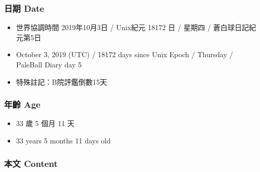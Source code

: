 \documentclass[a5paper, 12pt
]{book}
\providecommand{\tightlist}{%
  \setlength{\itemsep}{0pt}\setlength{\parskip}{0pt}}
\begin{document}
\hypertarget{ux65e5ux671f-date-2}{%
\subsubsection{日期 Date}\label{ux65e5ux671f-date-2}}

\begin{itemize}
\tightlist
\item
  世界協調時間 2019年10月3日 / Unix紀元 18172 日 / 星期四 /
  蒼白球日記紀元第5日
\item
  October 3, 2019 (UTC) / 18172 days since Unix Epoch / Thursday /
  PaleBall Diary day 5
\item
  特殊註記：B院評鑑倒數15天
\end{itemize}

\hypertarget{ux5e74ux9f61-age-2}{%
\subsubsection{年齡 Age}\label{ux5e74ux9f61-age-2}}

\begin{itemize}
\tightlist
\item
  33 歲 5 個月 11 天
\item
  33 years 5 months 11 days old
\end{itemize}

\hypertarget{ux672cux6587-content-2}{%
\subsubsection{本文 Content}\label{ux672cux6587-content-2}}
\end{document}
